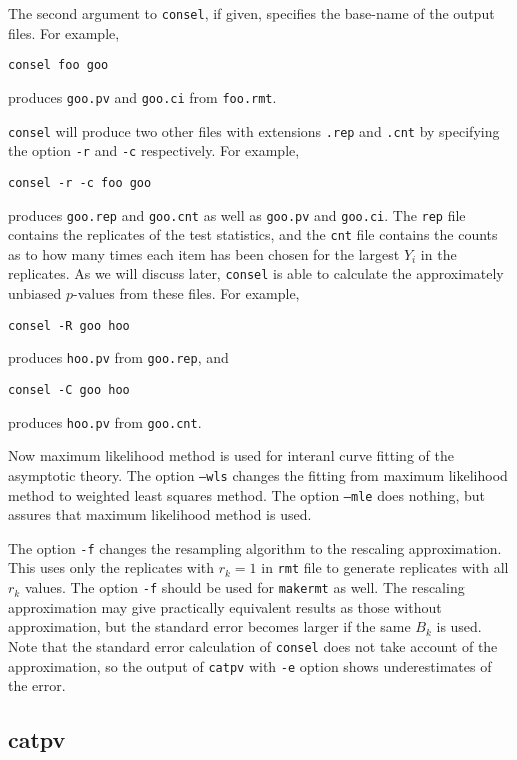\documentclass[12pt]{article}
\begin{document}
The second argument to {\tt consel}, if given, specifies the base-name
of the output files. For example,
\begin{verbatim}
consel foo goo
\end{verbatim}
produces {\tt goo.pv} and {\tt goo.ci} from {\tt foo.rmt}.

{\tt consel} will produce two other files with extensions {\tt .rep} and
{\tt .cnt} by specifying the option {\tt -r} and {\tt -c}
respectively. For example,
\begin{verbatim}
consel -r -c foo goo
\end{verbatim}
produces {\tt goo.rep} and {\tt goo.cnt} as well as {\tt goo.pv} and
{\tt goo.ci}. The {\tt rep} file contains the replicates of the test
statistics, and the {\tt cnt} file contains the counts as to how many
times each item has been chosen for the largest $Y_i$ in the
replicates. As we will discuss
later, {\tt consel} is able to calculate the approximately unbiased
$p$-values from these files. For example,
\begin{verbatim}
consel -R goo hoo
\end{verbatim}
produces {\tt hoo.pv} from {\tt goo.rep}, and
\begin{verbatim}
consel -C goo hoo
\end{verbatim}
produces {\tt hoo.pv} from {\tt goo.cnt}.  


Now maximum likelihood method is used for interanl curve fitting of the
asymptotic theory. The option {\tt --wls} changes the fitting from
maximum likelihood method to weighted least squares method.  The option
{\tt --mle} does nothing, but assures that maximum likelihood method is
used.

The option {\tt -f} changes the resampling algorithm to the rescaling
approximation. This uses only the replicates with $r_k=1$ in {\tt rmt}
file to generate replicates with all $r_k$ values. The option {\tt -f}
should be used for {\tt makermt} as well. The rescaling approximation
may give practically equivalent results as those without approximation,
but the standard error becomes larger if the same $B_k$ is used. Note
that the standard error calculation of {\tt consel} does not take account of
the approximation, so the output of {\tt catpv} with {\tt -e} option
shows underestimates of the error.



\subsection{catpv}
\end{document}

